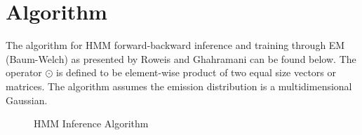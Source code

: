 \section{Algorithm}

The algorithm for HMM forward-backward inference and training through EM
(Baum-Welch) as presented by Roweis and Ghahramani \cite{ghahramani} can be
found below. The operator $\odot$ is defined to be element-wise product of two
equal size vectors or matrices. The algorithm assumes the emission distribution
is a multidimensional Gaussian.

\begin{figure}[!hbp]
\caption{HMM Inference Algorithm}
\vspace{0.6cm}
\end{figure}

